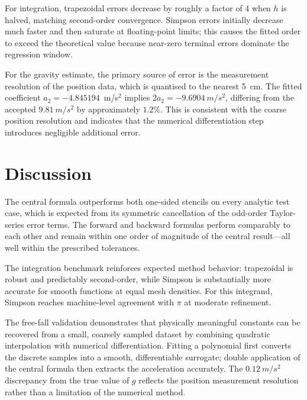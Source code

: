 \documentclass[letterpaper,twocolumn,fleqn]{article}
\begin{document}
For integration, trapezoidal errors decrease by roughly a factor of 4 when $h$ is halved, matching second-order convergence. Simpson errors initially decrease much faster and then saturate at floating-point limits; this causes the fitted order to exceed the theoretical value because near-zero terminal errors dominate the regression window.

For the gravity estimate, the primary source of error is the measurement resolution of the position data, which is quantised to the nearest \qty{5}{cm}. The fitted coefficient $a_{2}=\num{-4.845194}$~m/s$^{2}$ implies $2a_{2}=\qty{-9.6904}{m/s^2}$, differing from the accepted $\qty{9.81}{m/s^2}$ by approximately $1.2\%$. This is consistent with the coarse position resolution and indicates that the numerical differentiation step introduces negligible additional error.

\section{Discussion}
The central formula outperforms both one-sided stencils on every analytic test case, which is expected from its symmetric cancellation of the odd-order Taylor-series error terms. The forward and backward formulas perform comparably to each other and remain within one order of magnitude of the central result---all well within the prescribed tolerances.

The integration benchmark reinforces expected method behavior: trapezoidal is robust and predictably second-order, while Simpson is substantially more accurate for smooth functions at equal mesh densities. For this integrand, Simpson reaches machine-level agreement with $\pi$ at moderate refinement.

The free-fall validation demonstrates that physically meaningful constants can be recovered from a small, coarsely sampled dataset by combining quadratic interpolation with numerical differentiation. Fitting a polynomial first converts the discrete samples into a smooth, differentiable surrogate; double application of the central formula then extracts the acceleration accurately. The $\qty{0.12}{m/s^2}$ discrepancy from the true value of $g$ reflects the position measurement resolution rather than a limitation of the numerical method.

\end{document}
